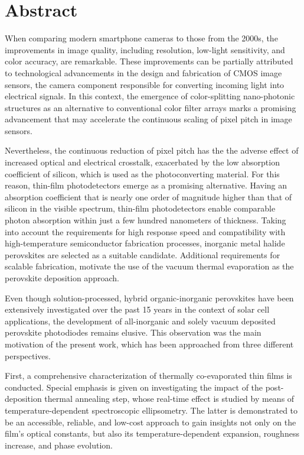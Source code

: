 \chapter{Abstract}                                 \label{ch:abstract}

When comparing modern smartphone cameras to those from the 2000s, the improvements in image quality, including resolution, low-light sensitivity, and color accuracy, are remarkable. These improvements can be partially attributed to technological advancements in the design and fabrication of CMOS image sensors, the camera component responsible for converting incoming light into electrical signals. In this context, the emergence of color-splitting nano-photonic structures as an alternative to conventional color filter arrays marks a promising advancement that may accelerate the continuous scaling of pixel pitch in image sensors.

Nevertheless, the continuous reduction of pixel pitch has the the adverse effect of increased optical and electrical crosstalk, exacerbated by the low absorption coefficient of silicon, which is used as the photoconverting material. For this reason, thin-film photodetectors emerge as a promising alternative. Having an absorption coefficient that is nearly one order of magnitude higher than that of silicon in the visible spectrum, thin-film photodetectors enable comparable photon absorption within just a few hundred nanometers of thickness. Taking into account the requirements for high response speed and compatibility with high-temperature semiconductor fabrication processes, inorganic metal halide perovskites are selected as a suitable candidate. Additional requirements for scalable fabrication, motivate the use of the vacuum thermal evaporation as the perovskite deposition approach. 

Even though solution-processed, hybrid organic-inorganic perovskites have been extensively investigated over the past 15 years in the context of solar cell applications, the development of all-inorganic and solely vacuum deposited perovskite photodiodes remains elusive. This observation was the main motivation of the present work, which has been approached from three different perspectives.

First, a comprehensive characterization of thermally co-evaporated  thin films is conducted. Special emphasis is given on investigating the impact of the post-deposition thermal annealing step, whose real-time effect is studied by means of temperature-dependent spectroscopic ellipsometry. The latter is demonstrated to be an accessible, reliable, and low-cost approach to gain insights not only on the film's optical constants, but also its temperature-dependent expansion, roughness increase, and phase evolution. 

